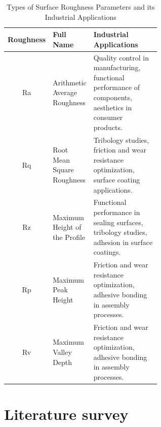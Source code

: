 \documentclass[suppldata]{interact}
\begin{document}
\begin{table} [hbtp] 
    \centering
    \caption{Types of Surface Roughness Parameters and its Industrial Applications}
    \label{tab:rapp}
    \begin{tabular}{|c|l|p{0.6\linewidth}| }  \hline
        \textbf{Roughness} & \textbf{Full Name} & \textbf{Industrial Applications} \\ \hline
        Ra & Arithmetic Average Roughness & Quality control in manufacturing, functional performance of components, aesthetics in consumer products. \\ \hline
        Rq & Root Mean Square Roughness & Tribology studies, friction and wear resistance optimization, surface coating applications. \\ \hline
        Rz & Maximum Height of the Profile & Functional performance in sealing surfaces, tribology studies, adhesion in surface coatings. \\ \hline
        Rp & Maximum Peak Height & Friction and wear resistance optimization, adhesive bonding in assembly processes. \\ \hline
        Rv & Maximum Valley Depth & Friction and wear resistance optimization, adhesive bonding in assembly processes. \\ \hline
       
    \end{tabular}
\end{table}
\clearpage 
  \section{Literature survey}  
\end{document}
